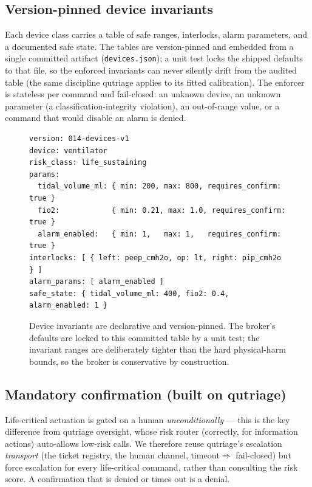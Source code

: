 \documentclass[11pt]{article}
\begin{document}
\subsection{Version-pinned device invariants}\label{sec:invariants}
Each device class carries a table of safe ranges, interlocks, alarm parameters,
and a documented safe state. The tables are version-pinned and embedded from a
single committed artifact (\texttt{devices.json}); a unit test locks the shipped
defaults to that file, so the enforced invariants can never silently drift from
the audited table (the same discipline qutriage applies to its fitted calibration).
The enforcer is stateless per command and fail-closed: an unknown device, an
unknown parameter (a classification-integrity violation), an out-of-range value,
or a command that would disable an alarm is denied.

\begin{figure}[htb]\centering
\begin{tcolorbox}[policycard, cardcol=cardteal, title=Ventilator safety table (excerpt from devices.json),
  width=0.86\linewidth]
\begin{lstlisting}[style=housespecyamlbare]
version: 014-devices-v1
device: ventilator
risk_class: life_sustaining
params:
  tidal_volume_ml: { min: 200, max: 800, requires_confirm: true }
  fio2:            { min: 0.21, max: 1.0, requires_confirm: true }
  alarm_enabled:   { min: 1,   max: 1,   requires_confirm: true }
interlocks: [ { left: peep_cmh2o, op: lt, right: pip_cmh2o } ]
alarm_params: [ alarm_enabled ]
safe_state: { tidal_volume_ml: 400, fio2: 0.4, alarm_enabled: 1 }
\end{lstlisting}
\end{tcolorbox}
\caption{Device invariants are declarative and version-pinned. The broker's
defaults are locked to this committed table by a unit test; the invariant ranges
are deliberately tighter than the hard physical-harm bounds, so the broker is
conservative by construction.}
\label{fig:spec}
\end{figure}

\subsection{Mandatory confirmation (built on qutriage)}
Life-critical actuation is gated on a human \emph{unconditionally} --- this is the
key difference from qutriage oversight, whose risk router (correctly, for information
actions) auto-allows low-risk calls. We therefore reuse qutriage's escalation
\emph{transport} (the ticket registry, the human channel, timeout$\Rightarrow$
fail-closed) but force escalation for every life-critical command, rather than
consulting the risk score. A confirmation that is denied or times out is a denial.
\end{document}
